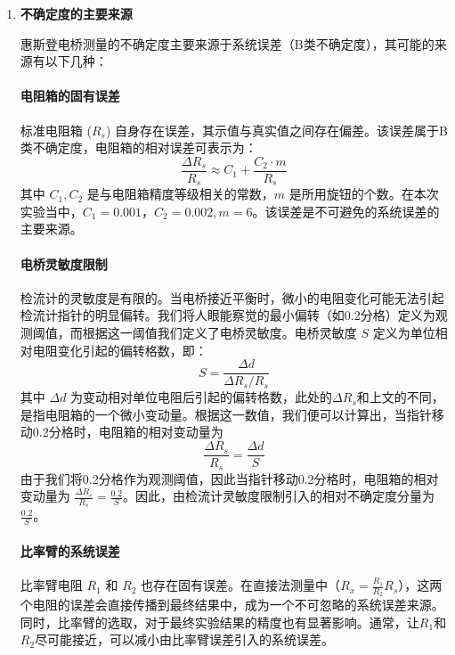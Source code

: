 \documentclass[]{../../templates/Report}%
\begin{document}
\begin{enumerate}[label=(\arabic*)]

\item \textbf{不确定度的主要来源}

惠斯登电桥测量的不确定度主要来源于系统误差（B类不确定度），其可能的来源有以下几种：

    \paragraph{电阻箱的固有误差}
    标准电阻箱 ($R_s$) 自身存在误差，其示值与真实值之间存在偏差。该误差属于B类不确定度，电阻箱的相对误差可表示为：
    \begin{equation}
    \frac{\Delta R_s}{R_s} \approx C_1 + \frac{C_2 \cdot m}{R_s}
    \end{equation}
    其中 $C_1, C_2$ 是与电阻箱精度等级相关的常数，$m$ 是所用旋钮的个数。在本次实验当中，$C_1=0.001$，$C_2=0.002,m=6$。该误差是不可避免的系统误差的主要来源。
    \paragraph{电桥灵敏度限制}
    检流计的灵敏度是有限的。当电桥接近平衡时，微小的电阻变化可能无法引起检流计指针的明显偏转。我们将人眼能察觉的最小偏转（如0.2分格）定义为观测阈值，而根据这一阈值我们定义了电桥灵敏度。电桥灵敏度 $S$ 定义为单位相对电阻变化引起的偏转格数，即：
    \begin{equation}
        S = \frac{\Delta d}{\Delta R_s / R_s}
    \end{equation}
    其中 $\Delta d$ 为变动相对单位电阻后引起的偏转格数，此处的$\Delta R_s$和上文的不同，是指电阻箱的一个微小变动量。根据这一数值，我们便可以计算出，当指针移动0.2分格时，电阻箱的相对变动量为 
    \begin{equation}
        \frac{\Delta R_s}{R_s} = \frac{\Delta d}{S}
    \end{equation}
    由于我们将0.2分格作为观测阈值，因此当指针移动0.2分格时，电阻箱的相对变动量为 $\frac{\Delta R_s}{R_s}=\frac{0.2}{S}$。因此，由检流计灵敏度限制引入的相对不确定度分量为 $\frac{0.2}{S}$。
    \paragraph{比率臂的系统误差}
    比率臂电阻 $R_1$ 和 $R_2$ 也存在固有误差。在直接法测量中（$R_x = \frac{R_1}{R_2}R_s$），这两个电阻的误差会直接传播到最终结果中，成为一个不可忽略的系统误差来源。同时，比率臂的选取，对于最终实验结果的精度也有显著影响。通常，让$R_1$和$R_2$尽可能接近，可以减小由比率臂误差引入的系统误差。


\end{enumerate}
\end{document}
